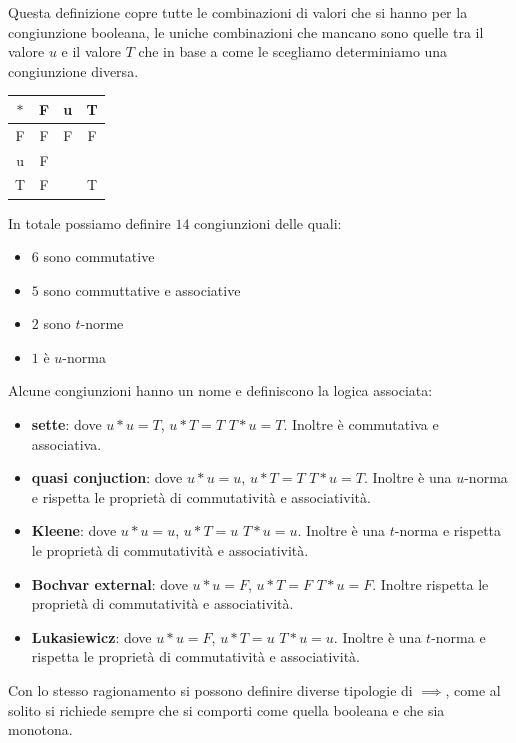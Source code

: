 Questa definizione copre tutte le combinazioni di valori che si hanno per la congiunzione 
booleana, le uniche combinazioni che mancano sono quelle tra il valore $u$ e 
il valore $T$ che in base a come le scegliamo determiniamo una congiunzione diversa.

\begin{table}[!h]
    \centering
    \begin{tabular}{c|c|c|c}
        $\ast$ & F & u & T \\
        \hline
        F        & F & F & F \\
        u        & F &  &  \\
        T        & F &  & T
    \end{tabular}
\end{table}

In totale possiamo definire $14$ congiunzioni delle quali:
\begin{itemize}
    \item $6$ sono commutative 
    \item $5$ sono commuttative e associative
    \item $2$ sono $t$-norme
    \item $1$ è $u$-norma
\end{itemize}

Alcune congiunzioni hanno un nome e definiscono la logica associata:
\begin{itemize}
    \item \textbf{sette}: dove $u\ast u= T$, $u\ast T = T$ $T\ast u = T$. Inoltre 
    è commutativa e associativa.
    \item \textbf{quasi conjuction}: dove $u\ast u= u$, $u\ast T = T$ $T\ast u = T$. Inoltre 
    è una $u$-norma e rispetta le proprietà di commutatività e associatività.
    \item \textbf{Kleene}: dove $u\ast u= u$, $u\ast T = u$ $T\ast u = u$. Inoltre 
    è una $t$-norma e rispetta le proprietà di commutatività e associatività.
    \item \textbf{Bochvar external}: dove $u\ast u= F$, $u\ast T = F$ $T\ast u = F$.
    Inoltre rispetta le proprietà di commutatività e associatività.
    \item \textbf{Lukasiewicz}: dove $u\ast u= F$, $u\ast T = u$ $T\ast u = u$. Inoltre 
    è una $t$-norma e rispetta le proprietà di commutatività e associatività.
\end{itemize}

Con lo stesso ragionamento si possono definire diverse tipologie di $\implies$,
come al solito si richiede sempre che si comporti come quella booleana e che sia 
monotona.


